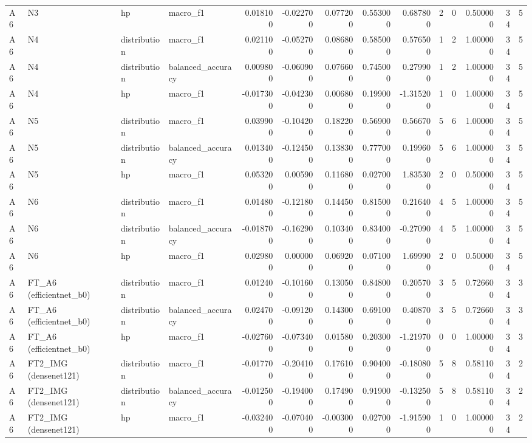 \begin{table}
\begin{tabular}{llllrrrrrrrrrr}
A6 & N3 & hp & macro\_f1 & 0.018100 & -0.022700 & 0.077200 & 0.553000 & 0.687800 & 2 & 0 & 0.500000 & 34 & 5 \\
A6 & N4 & distribution & macro\_f1 & 0.021100 & -0.052700 & 0.086800 & 0.585000 & 0.576500 & 1 & 2 & 1.000000 & 34 & 5 \\
A6 & N4 & distribution & balanced\_accuracy & 0.009800 & -0.060900 & 0.076600 & 0.745000 & 0.279900 & 1 & 2 & 1.000000 & 34 & 5 \\
A6 & N4 & hp & macro\_f1 & -0.017300 & -0.042300 & 0.006800 & 0.199000 & -1.315200 & 1 & 0 & 1.000000 & 34 & 5 \\
A6 & N5 & distribution & macro\_f1 & 0.039900 & -0.104200 & 0.182200 & 0.569000 & 0.566700 & 5 & 6 & 1.000000 & 34 & 5 \\
A6 & N5 & distribution & balanced\_accuracy & 0.013400 & -0.124500 & 0.138300 & 0.777000 & 0.199600 & 5 & 6 & 1.000000 & 34 & 5 \\
A6 & N5 & hp & macro\_f1 & 0.053200 & 0.005900 & 0.116800 & 0.027000 & 1.835300 & 2 & 0 & 0.500000 & 34 & 5 \\
A6 & N6 & distribution & macro\_f1 & 0.014800 & -0.121800 & 0.144500 & 0.815000 & 0.216400 & 4 & 5 & 1.000000 & 34 & 5 \\
A6 & N6 & distribution & balanced\_accuracy & -0.018700 & -0.162900 & 0.103400 & 0.834000 & -0.270900 & 4 & 5 & 1.000000 & 34 & 5 \\
A6 & N6 & hp & macro\_f1 & 0.029800 & 0.000000 & 0.069200 & 0.071000 & 1.699900 & 2 & 0 & 0.500000 & 34 & 5 \\
A6 & FT\_A6 (efficientnet\_b0) & distribution & macro\_f1 & 0.012400 & -0.101600 & 0.130500 & 0.848000 & 0.205700 & 3 & 5 & 0.726600 & 34 & 3 \\
A6 & FT\_A6 (efficientnet\_b0) & distribution & balanced\_accuracy & 0.024700 & -0.091200 & 0.143000 & 0.691000 & 0.408700 & 3 & 5 & 0.726600 & 34 & 3 \\
A6 & FT\_A6 (efficientnet\_b0) & hp & macro\_f1 & -0.027600 & -0.073400 & 0.015800 & 0.203000 & -1.219700 & 0 & 0 & 1.000000 & 34 & 3 \\
A6 & FT2\_IMG (densenet121) & distribution & macro\_f1 & -0.017700 & -0.204100 & 0.176100 & 0.904000 & -0.180800 & 5 & 8 & 0.581100 & 34 & 2 \\
A6 & FT2\_IMG (densenet121) & distribution & balanced\_accuracy & -0.012500 & -0.194000 & 0.174900 & 0.919000 & -0.132500 & 5 & 8 & 0.581100 & 34 & 2 \\
A6 & FT2\_IMG (densenet121) & hp & macro\_f1 & -0.032400 & -0.070400 & -0.003000 & 0.027000 & -1.915900 & 1 & 0 & 1.000000 & 34 & 2 \\

\end{tabular}
\end{table}
